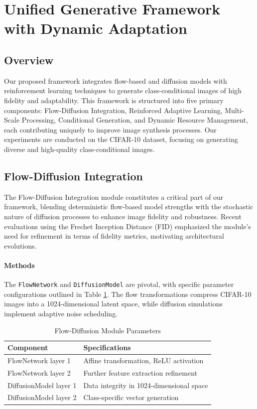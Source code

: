 \section{Unified Generative Framework with Dynamic Adaptation}

\subsection{Overview}

Our proposed framework integrates flow-based and diffusion models with reinforcement learning techniques to generate class-conditional images of high fidelity and adaptability. This framework is structured into five primary components: Flow-Diffusion Integration, Reinforced Adaptive Learning, Multi-Scale Processing, Conditional Generation, and Dynamic Resource Management, each contributing uniquely to improve image synthesis processes. Our experiments are conducted on the CIFAR-10 dataset, focusing on generating diverse and high-quality class-conditional images.

\subsection{Flow-Diffusion Integration}

The Flow-Diffusion Integration module constitutes a critical part of our framework, blending deterministic flow-based model strengths with the stochastic nature of diffusion processes to enhance image fidelity and robustness. Recent evaluations using the Frechet Inception Distance (FID) emphasized the module's need for refinement in terms of fidelity metrics, motivating architectural evolutions.

\paragraph{Methods}
The \texttt{FlowNetwork} and \texttt{DiffusionModel} are pivotal, with specific parameter configurations outlined in Table \ref{tab:flow-diffusion-params}. The flow transformations compress CIFAR-10 images into a 1024-dimensional latent space, while diffusion simulations implement adaptive noise scheduling.

\begin{table}[!ht]
\centering
\label{tab:flow-diffusion-params}
\begin{tabular}{|l|l|}
\hline
\textbf{Component} & \textbf{Specifications} \\ \hline
FlowNetwork layer 1 & Affine transformation, ReLU activation \\ \hline
FlowNetwork layer 2 & Further feature extraction refinement \\ \hline
DiffusionModel layer 1 & Data integrity in 1024-dimensional space \\ \hline
DiffusionModel layer 2 & Class-specific vector generation \\ \hline
\end{tabular}
\caption{Flow-Diffusion Module Parameters}
\end{table}

